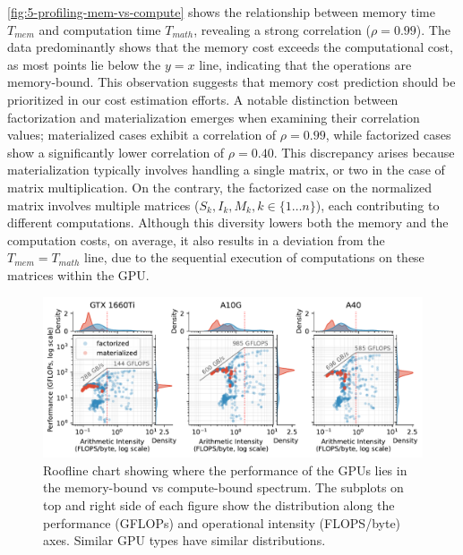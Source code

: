 \autoref{fig:5-profiling-mem-vs-compute} shows the relationship between memory time $T_{mem}$ and computation time $T_{math}$, revealing a strong correlation ($\rho = 0.99$). The data predominantly shows that the memory cost exceeds the computational cost, as most points lie below the $y=x$ line, indicating that the operations are memory-bound. This observation suggests that memory cost prediction should be prioritized in our cost estimation efforts. A notable distinction between factorization and materialization emerges when examining their correlation values; materialized cases exhibit a correlation of $\rho = 0.99$, while factorized cases show a significantly lower correlation of $\rho = 0.40$. This discrepancy arises because materialization typically involves handling a single matrix, or two in the case of matrix multiplication. On the contrary, the factorized case on the normalized matrix involves multiple matrices ($S_k,I_k,M_k, k \in \{1 \ldots n\}$), each contributing to different computations. Although this diversity lowers both the memory and the computation costs, on average, it also results in a deviation from the $T_{mem} = T_{math}$ line, due to the sequential execution of computations on these matrices within the GPU.

\begin{figure}
  \centering
  \includegraphics[width=\linewidth]{chapters/05_cost_estimation/figures/roofline-plot.pdf}
  \caption[Roofline chart comparing F/M, per GPU]{Roofline chart showing where the performance of the GPUs lies in the memory-bound vs compute-bound spectrum. The subplots on top and right side of each figure show the distribution along the performance (GFLOPs) and operational intensity (FLOPS/byte) axes. Similar GPU types have similar distributions.}
  \label{fig:5-roofline-plot}
\end{figure}

